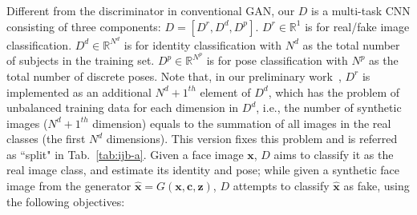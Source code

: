 \documentclass[10pt,journal,compsoc]{IEEEtran}
\begin{document}
Different from the discriminator in conventional GAN, our $D$ is a multi-task CNN consisting of three components: $D = [D^r, D^d, D^p]$. 
$D^r\in \mathbb{R}^{1}$ is for real/fake image classification. 
$D^d\in \mathbb{R}^{N^d}$ is for identity classification with $N^d$ as the total number of subjects in the training set.
$D^p\in \mathbb{R}^{N^p}$ is for pose classification with $N^p$ as the total number of discrete poses.
Note that, in our preliminary work~\cite{tran2017disentangled}, $D^r$ is implemented as an additional $N^d+1^{th}$ element of $D^d$, which has the problem of unbalanced training data for each dimension in $D^d$, i.e., the number of synthetic images ($N^d+1^{th}$ dimension) equals to the summation of all images in the real classes (the first $N^d$ dimensions). 
This version fixes this problem and is referred as ``split" in Tab.~\ref{tab:ijb-a}.
Given a face image $\mathbf{x}$,  $D$ aims to classify it as the real image class, and estimate its identity and pose; while given a synthetic face image from the generator $\hat{\mathbf{x}} = G(\mathbf{x}, \mathbf{c}, \mathbf{z})$, $D$ attempts to classify $\hat{\mathbf{x}}$ as fake, using the following objectives:
\end{document}
